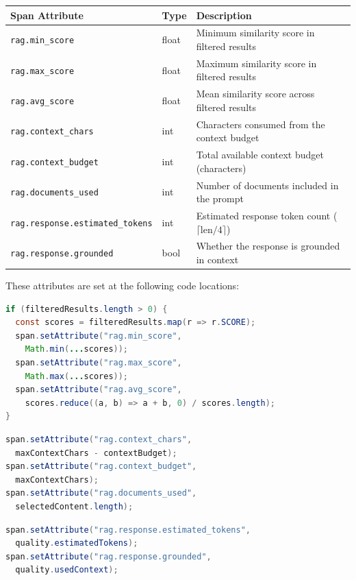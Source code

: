 \documentclass[11pt]{article}
\begin{document}
\begin{longtable}{lll}
\toprule
\textbf{Span Attribute} & \textbf{Type} & \textbf{Description} \\
\midrule
\endhead
\texttt{rag.min\_score} & float & Minimum similarity score in filtered results \\
\texttt{rag.max\_score} & float & Maximum similarity score in filtered results \\
\texttt{rag.avg\_score} & float & Mean similarity score across filtered results \\
\texttt{rag.context\_chars} & int & Characters consumed from the context budget \\
\texttt{rag.context\_budget} & int & Total available context budget (characters) \\
\texttt{rag.documents\_used} & int & Number of documents included in the prompt \\
\texttt{rag.response.estimated\_tokens} & int & Estimated response token count ($\lceil \text{len}/4 \rceil$) \\
\texttt{rag.response.grounded} & bool & Whether the response is grounded in context \\
\bottomrule
\end{longtable}

These attributes are set at the following code locations:

\begin{lstlisting}[language=Java,caption={Score statistics --- lines 496--500}]
if (filteredResults.length > 0) {
  const scores = filteredResults.map(r => r.SCORE);
  span.setAttribute("rag.min_score",
    Math.min(...scores));
  span.setAttribute("rag.max_score",
    Math.max(...scores));
  span.setAttribute("rag.avg_score",
    scores.reduce((a, b) => a + b, 0) / scores.length);
}
\end{lstlisting}

\begin{lstlisting}[language=Java,caption={Context budget spans --- lines 532--534}]
span.setAttribute("rag.context_chars",
  maxContextChars - contextBudget);
span.setAttribute("rag.context_budget",
  maxContextChars);
span.setAttribute("rag.documents_used",
  selectedContent.length);
\end{lstlisting}

\begin{lstlisting}[language=Java,caption={Response quality spans --- lines 573--574}]
span.setAttribute("rag.response.estimated_tokens",
  quality.estimatedTokens);
span.setAttribute("rag.response.grounded",
  quality.usedContext);
\end{lstlisting}
\end{document}
